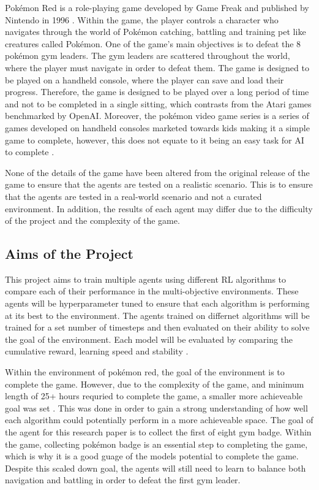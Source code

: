 Pokémon Red is a role-playing game developed by Game Freak and published by Nintendo in 1996 \cite{HubZ_1998}. Within the game, the player controls a character who navigates through the world of Pokémon catching, battling and training pet like creatures called Pokémon. One of the game's main objectives is to defeat the 8 pokémon gym leaders. The gym leaders are scattered throughout the world, where the player must navigate in order to defeat them. The game is designed to be played on a handheld console, where the player can save and load their progress. Therefore, the game is designed to be played over a long period of time and not to be completed in a single sitting, which contrasts from the Atari games benchmarked by OpenAI. Moreover, the pokémon video game series is a series of games developed on handheld consoles marketed towards kids making it a simple game to complete, however, this does not equate to it being an easy task for AI to complete \cite{HubZ_1998}. 

None of the details of the game have been altered from the original release of the game to ensure that the agents are tested on a realistic scenario. This is to ensure that the agents are tested in a real-world scenario and not a curated environment. In addition, the results of each agent may differ due to the difficulty of the project and the complexity of the game.  

\subsection{Aims of the Project}

This project aims to train multiple agents using different RL algorithms to compare each of their performance in the multi-objective environments. These agents will be hyperparameter tuned to ensure that each algorithm is performing at its best to the environment. The agents trained on differnet algorithms will be trained for a set number of timesteps and then evaluated on their ability to solve the goal of the environment. Each model will be evaluated by comparing the cumulative reward, learning speed and stability \cite{Sutton1}. 

Within the environment of pokémon red, the goal of the environment is to complete the game. However, due to the complexity of the game, and minimum length of 25+ hours requried to complete the game, a smaller more achieveable goal was set \cite{howlongtobeat}. This was done in order to gain a strong understanding of how well each algorithm could potentially perform in a more achieveable space. The goal of the agent for this research paper is to collect the first of eight gym badge. Within the game, collecting pokémon badge is an essential step to completing the game, which is why it is a good guage of the models potential to complete the game. Despite this scaled down goal, the agents will still need to learn to balance both navigation and battling in order to defeat the first gym leader.